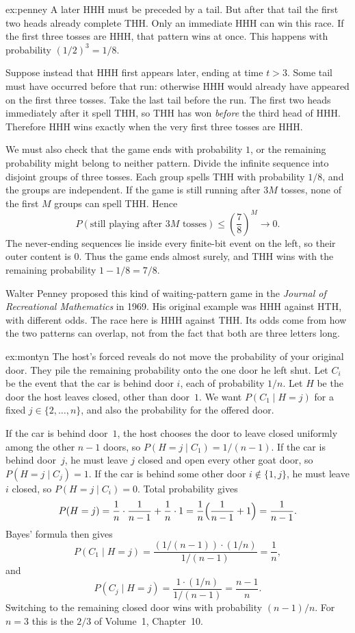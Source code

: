 \begin{solution}{ex:penney}
\idea A later HHH must be preceded by a tail. But after that tail the first two heads already complete THH. Only an immediate HHH can win this race.
\writeup If the first three tosses are HHH, that pattern wins at once. This happens with probability $(1/2)^3=1/8$.

Suppose instead that HHH first appears later, ending at time $t>3$. Some tail must have occurred before that run: otherwise HHH would already have appeared on the first three tosses. Take the last tail before the run. The first two heads immediately after it spell THH, so THH has won \emph{before} the third head of HHH. Therefore HHH wins exactly when the very first three tosses are HHH.

We must also check that the game ends with probability $1$, or the remaining probability might belong to neither pattern. Divide the infinite sequence into disjoint groups of three tosses. Each group spells THH with probability $1/8$, and the groups are independent. If the game is still running after $3M$ tosses, none of the first $M$ groups can spell THH. Hence
\[
 P(\text{still playing after $3M$ tosses})
 \le\left(\frac78\right)^M\longrightarrow0.
\]
The never-ending sequences lie inside every finite-bit event on the left, so their outer content is $0$. Thus the game ends almost surely, and THH wins with the remaining probability $1-1/8=7/8$.

Walter Penney proposed this kind of waiting-pattern game in the \emph{Journal of Recreational Mathematics} in 1969. His original example was HHH against HTH, with different odds. The race here is HHH against THH. Its odds come from how the two patterns can overlap, not from the fact that both are three letters long.
\end{solution}

\begin{solution}{ex:montyn}
\idea The host's forced reveals do not move the probability of your original door. They pile the remaining probability onto the one door he left shut.
\writeup Let $C_i$ be the event that the car is behind door $i$, each of probability $1/n$. Let $H$ be the door the host leaves closed, other than door~$1$. We want $P(C_1\mid H=j)$ for a fixed $j\in\{2,\ldots,n\}$, and also the probability for the offered door.

If the car is behind door~$1$, the host chooses the door to leave closed uniformly among the other $n-1$ doors, so $P(H=j\mid C_1)=1/(n-1)$. If the car is behind door~$j$, he must leave $j$ closed and open every other goat door, so $P(H=j\mid C_j)=1$. If the car is behind some other door $i\notin\{1,j\}$, he must leave $i$ closed, so $P(H=j\mid C_i)=0$. Total probability gives
\[
 P(H=j)=\frac1n\cdot\frac1{n-1}+\frac1n\cdot1=\frac1n\Bigl(\frac1{n-1}+1\Bigr)=\frac1{n-1}.
\]
Bayes' formula then gives
\[
 P(C_1\mid H=j)=\frac{(1/(n-1))\cdot(1/n)}{1/(n-1)}=\frac1n,
\]
and
\[
 P(C_j\mid H=j)=\frac{1\cdot(1/n)}{1/(n-1)}=\frac{n-1}n.
\]
Switching to the remaining closed door wins with probability $(n-1)/n$. For $n=3$ this is the $2/3$ of Volume~1, Chapter~10.
\end{solution}


